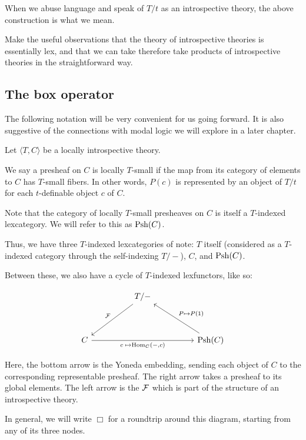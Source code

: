 When we abuse language and speak of $T/t$ as an introspective theory, the above construction is what we mean.

\begin{TODOblock}
Make the useful observations that the theory of introspective theories is essentially lex, and that we can take therefore take products of introspective theories in the straightforward way.
\end{TODOblock}

\subsection{The box operator}

The following notation will be very convenient for us going forward. It is also suggestive of the connections with modal logic we will explore in a later chapter.

Let $\langle T, C \rangle$ be a locally introspective theory.

We say a presheaf on $C$ is locally $T$-small if the map from its category of elements to $C$ has $T$-small fibers. In other words, $P(c)$ is represented by an object of $T/t$ for each $t$-definable object $c$ of $C$.

Note that the category of locally $T$-small presheaves on $C$ is itself a $T$-indexed lexcategory. We will refer to this as $\operatorname{Psh}(C)$.

Thus, we have three $T$-indexed lexcategories of note: $T$ itself (considered as a $T$-indexed category through the self-indexing $T/-$), $C$, and $\operatorname{Psh}(C)$.

Between these, we also have a cycle of $T$-indexed lexfunctors, like so:

\[\begin{tikzcd}
	&& {T/-} \\
	\\
	C &&&& {\Psh{C}}
	\arrow["\introF"', from=1-3, to=3-1]
	\arrow["{c \; \mapsto \Hom_{C}(-, c)}"', from=3-1, to=3-5]
	\arrow["{P \mapsto P(1)}"', from=3-5, to=1-3]
\end{tikzcd}\]

Here, the bottom arrow is the Yoneda embedding, sending each object of $C$ to the corresponding representable presheaf. The right arrow takes a presheaf to its global elements. The left arrow is the $\mathcal{F}$ which is part of the structure of an introspective theory.

In general, we will write $\Box$ for a roundtrip around this diagram, starting from any of its three nodes.

